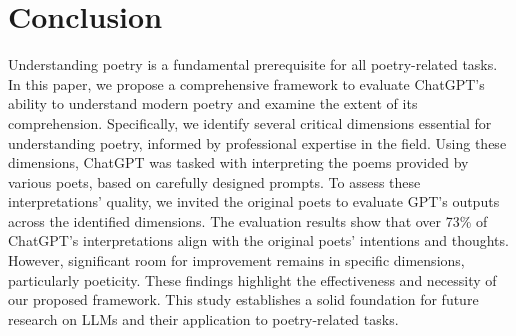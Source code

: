 \documentclass[11pt]{article}
\begin{document}
\section{Conclusion}

Understanding poetry is a fundamental prerequisite for all poetry-related tasks. In this paper, we propose a comprehensive framework to evaluate ChatGPT’s ability to understand modern poetry and examine the extent of its comprehension. Specifically, we identify several critical dimensions essential for understanding poetry, informed by professional expertise in the field. Using these dimensions, ChatGPT was tasked with interpreting the poems provided by various poets, based on carefully designed prompts. To assess these interpretations’ quality, we invited the original poets to evaluate GPT’s outputs across the identified dimensions. The evaluation results show that over 73\% of ChatGPT’s interpretations align with the original poets’ intentions and thoughts. However, significant room for improvement remains in specific dimensions, particularly poeticity. These findings highlight the effectiveness and necessity of our proposed framework. This study establishes a solid foundation for future research on LLMs and their application to poetry-related tasks.




\end{document}
